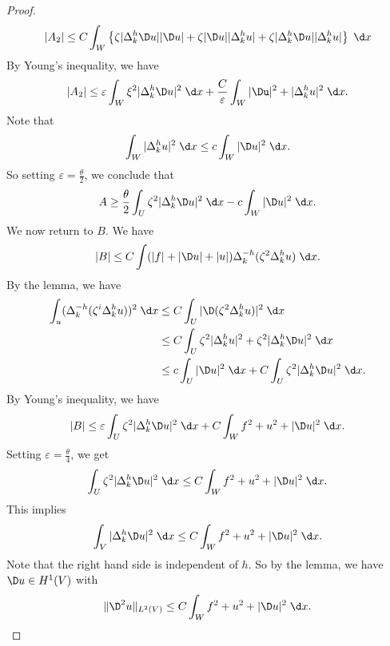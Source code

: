 \documentclass[a4paper]{article}
\begin{document}
\begin{proof}
  \[
    |A_2| \leq C \int_W \left\{\zeta |\Delta^h_k \D u| |\D u| + \zeta |\D u| |\Delta_k^h u| + \zeta |\Delta^h_k \D u| |\Delta^h_k u|\right\}\;\d x
  \]
  By Young's inequality, we have
  \[
    |A_2| \leq \varepsilon \int_W \xi^2 |\Delta_k^h \D u|^2 \;\d x + \frac{C}{\varepsilon} \int_W |\Du|^2 + |\Delta_k^h u|^2\;\d x.
  \]
  Note that
  \[
    \int_W |\Delta_k^h u|^2\;\d x \leq c \int_W |\D u|^2 \;\d x.
  \]
  So setting $\varepsilon = \frac{\theta}{2}$, we conclude that
  \[
    A \geq \frac{\theta}{2} \int_U \zeta^2 |\Delta_k^h \D u|^2 \;\d x - c \int_W |\D u|^2\;\d x.
  \]
  We now return to $B$. We have
  \[
    |B| \leq C \int (|f| + |\D u| + |u|) \Delta^{-h}_k (\zeta^2 \Delta_k^h u)\;\d x.
  \]
  By the lemma, we have
  \begin{align*}
    \int_u (\Delta_k^{-h} (\zeta^i \Delta_k^h u))^2\;\d x &\leq C \int_U |\D(\zeta^2 \Delta_k^h u)|^2 \;\d x\\
    &\leq C \int_U \zeta^2 |\Delta_k^h u|^2 + \zeta^2 |\Delta^h_k \D u|^2\;\d x\\
    &\leq c \int_U |\D u|^2 \;\d x + C \int_U \zeta^2 |\Delta^h_k \D u|^2\;\d x.
  \end{align*}
  By Young's inequality, we have
  \[
    |B| \leq \varepsilon \int_U \zeta^2 |\Delta_k^h \D u|^2\;\d x + C \int_W f^2 + u^2 + |\D u|^2 \;\d x.
  \]
  Setting $\varepsilon = \frac{\theta}{4}$, we get
  \[
   \int_U \zeta^2 |\Delta_k^h \D u|^2 \;\d x \leq C \int_W f^2 + u^2 + |\D u|^2 \;\d x.
  \]
  This implies
  \[
    \int_V |\Delta_k^h \D u|^2 \;\d x \leq C \int_W f^2 + u^2 + |\D u|^2\;\d x.
  \]
  Note that the right hand side is independent of $h$. So by the lemma, we have $\D u \in H^1(V)$ with
  \[
    \|\D^2 u\|_{L^2(V)} \leq C \int_W f^2 + u^2 + |\D u|^2\;\d x.
  \]
\end{proof}
\end{document}
